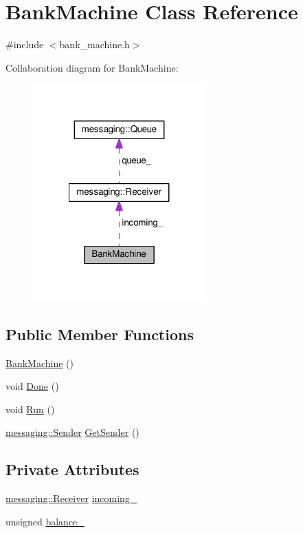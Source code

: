 \hypertarget{classBankMachine}{\section{Bank\-Machine Class Reference}
\label{classBankMachine}
}


{\ttfamily \#include $<$bank\-\_\-machine.\-h$>$}



Collaboration diagram for Bank\-Machine\-:
\nopagebreak
\begin{figure}[H]
\begin{center}
\leavevmode
\includegraphics[width=188pt]{classBankMachine__coll__graph}
\end{center}
\end{figure}
\subsection*{Public Member Functions}
\begin{DoxyCompactItemize}
\item 
\hyperlink{classBankMachine_aafdb9bf4f04bec9c6ac3b9ec2229843e}{Bank\-Machine} ()
\item 
void \hyperlink{classBankMachine_afaf799b68e5965bb473cee993fffee74}{Done} ()
\item 
void \hyperlink{classBankMachine_adba1d635c9837305c1e0fe4f70efdcdb}{Run} ()
\item 
\hyperlink{classmessaging_1_1Sender}{messaging\-::\-Sender} \hyperlink{classBankMachine_a5d8bf0c5b153073a6bfa76bd2ee29acb}{Get\-Sender} ()
\end{DoxyCompactItemize}
\subsection*{Private Attributes}
\begin{DoxyCompactItemize}
\item 
\hyperlink{classmessaging_1_1Receiver}{messaging\-::\-Receiver} \hyperlink{classBankMachine_a80fe063f235cf02d33a2d70aeef6048c}{incoming\-\_\-}
\item 
unsigned \hyperlink{classBankMachine_ad299fdb18b1ee6e66374f70dde18d584}{balance\-\_\-}
\end{DoxyCompactItemize}



